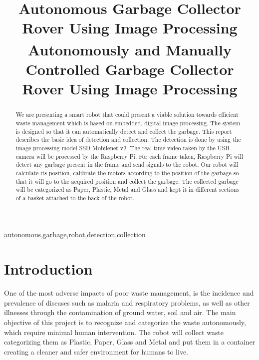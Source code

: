 \documentclass[conference]{IEEEtran}
\begin{document}
	
	\title{\LARGE{Autonomous Garbage Collector Rover Using Image Processing}\\
		{\footnotesize \textsuperscript{}Autonomously and Manually Controlled Garbage Collector Rover Using Image Processing}
	}
	
	\author{
	
		\and
		
	}
	
	\maketitle
	
	\begin{abstract}
		We are presenting a smart robot that could present a viable solution towards efficient waste management which is based on embedded, digital image processing. The system is designed so that it can automatically detect and collect the garbage. This report describes the basic idea of detection and collection. The detection is done by using the image processing model SSD Mobilenet v2. The real time video taken by the USB camera will be processed by the Raspberry Pi.  For each frame taken, Raspberry Pi will detect any garbage present in the frame and send signals to the robot. Our robot will calculate its position, calibrate the motors according to the position of the garbage so that it will go to the acquired position and collect the garbage. The collected garbage will be categorized as Paper, Plastic, Metal and Glass and kept it in different sections of a basket attached to the back of the robot.
	\end{abstract}
	
	\begin{IEEEkeywords}
		autonomous,garbage,robot,detection,collection
	\end{IEEEkeywords}
	
	\section{Introduction}
	One of the most adverse impacts of poor waste management, is the incidence and prevalence of diseases such as malaria and respiratory problems, as well as other illnesses through the contamination of ground water, soil and air. The main objective of this project is to recognize and categorize the waste autonomously, which require minimal human intervention. The robot will collect waste categorizing them as Plastic, Paper, Glass and Metal and put them in a container creating a cleaner and safer environment for humans to live. 
	
\end{document}
